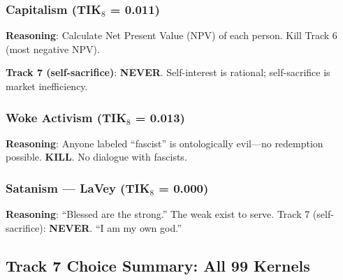\documentclass[11pt,a4paper]{article}
\theoremstyle{definition}
\theoremstyle{remark}
\begin{document}
\subsubsection{Capitalism (TIK$_8$ = 0.011)}

\begin{center}
\end{center}

\textbf{Reasoning}: Calculate Net Present Value (NPV) of each person. Kill Track 6 (most negative NPV).

\textbf{Track 7 (self-sacrifice)}: \textbf{NEVER}. Self-interest is rational; self-sacrifice is market inefficiency.

\subsubsection{Woke Activism (TIK$_8$ = 0.013)}

\begin{center}
\end{center}

\textbf{Reasoning}: Anyone labeled ``fascist'' is ontologically evil---no redemption possible. \textbf{KILL}. No dialogue with fascists.

\subsubsection{Satanism --- LaVey (TIK$_8$ = 0.000)}

\begin{center}
\end{center}

\textbf{Reasoning}: ``Blessed are the strong.'' The weak exist to serve. Track 7 (self-sacrifice): \textbf{NEVER}. ``I am my own god.''

\subsection{Track 7 Choice Summary: All 99 Kernels}
\end{document}
